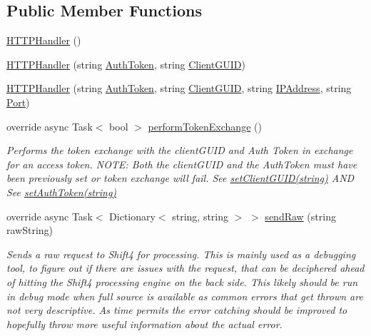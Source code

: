 \subsection*{Public Member Functions}
\begin{DoxyCompactItemize}
\item 
\mbox{\hyperlink{class_form_sim_1_1_h_t_t_p_handler_a8986ccceb64ce8804f354744961fc31f}{H\+T\+T\+P\+Handler}} ()
\item 
\mbox{\hyperlink{class_form_sim_1_1_h_t_t_p_handler_a2c39bc0dae5d5f2b26a84b1867d6ca23}{H\+T\+T\+P\+Handler}} (string \mbox{\hyperlink{class_form_sim_1_1_generic_handler_a6699d8bfc9cd305baf30ab9413b21605}{Auth\+Token}}, string \mbox{\hyperlink{class_form_sim_1_1_generic_handler_ae1d2175b140f4c600d74bbab1e22714e}{Client\+G\+U\+ID}})
\item 
\mbox{\hyperlink{class_form_sim_1_1_h_t_t_p_handler_af7f2265f6f02187c1470ef72d1c68e95}{H\+T\+T\+P\+Handler}} (string \mbox{\hyperlink{class_form_sim_1_1_generic_handler_a6699d8bfc9cd305baf30ab9413b21605}{Auth\+Token}}, string \mbox{\hyperlink{class_form_sim_1_1_generic_handler_ae1d2175b140f4c600d74bbab1e22714e}{Client\+G\+U\+ID}}, string \mbox{\hyperlink{class_form_sim_1_1_generic_handler_a12b51dea082a4d40d86829802adf073b}{I\+P\+Address}}, string \mbox{\hyperlink{class_form_sim_1_1_generic_handler_ac6492bb3e4fbe8f66c97b00bd27020c1}{Port}})
\item 
override async Task$<$ bool $>$ \mbox{\hyperlink{class_form_sim_1_1_h_t_t_p_handler_ae2ace13d7dc63f0bf1e1ef1a41bf8a3e}{perform\+Token\+Exchange}} ()
\begin{DoxyCompactList}\small\item\em Performs the token exchange with the client\+G\+U\+ID and Auth Token in exchange for an access token. N\+O\+TE\+: Both the client\+G\+U\+ID and the Auth\+Token must have been previously set or token exchange will fail. See \mbox{\hyperlink{interface_form_sim_1_1_f_r_c___handler_a3c77b2e99c98553928e463a9cbb5f7d4}{set\+Client\+G\+U\+I\+D(string)}} A\+ND See \mbox{\hyperlink{interface_form_sim_1_1_f_r_c___handler_a1314ea0937067435e3326818baa9d0c1}{set\+Auth\+Token(string)}} \end{DoxyCompactList}\item 
override async Task$<$ Dictionary$<$ string, string $>$ $>$ \mbox{\hyperlink{class_form_sim_1_1_h_t_t_p_handler_a31006e646afd7cb331784dce27760d5b}{send\+Raw}} (string raw\+String)
\begin{DoxyCompactList}\small\item\em Sends a raw request to Shift4 for processing. This is mainly used as a debugging tool, to figure out if there are issues with the request, that can be deciphered ahead of hitting the Shift4 processing engine on the back side. This likely should be run in debug mode when full source is available as common errors that get thrown are not very descriptive. As time permits the error catching should be improved to hopefully throw more useful information about the actual error. \end{DoxyCompactList}\end{DoxyCompactItemize}
